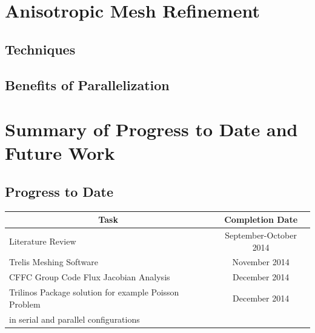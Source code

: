 \documentclass[titlepage,11pt,letterpaper]{article}
\begin{document}
\newpage
\section{Anisotropic Mesh Refinement}
\subsection{Techniques}
\subsection{Benefits of Parallelization}



\newpage
\section{Summary of Progress to Date and Future Work}

\subsection{Progress to Date}

\begin{tabular}{|l|c|} \hline
\multicolumn{1}{|c|}{\bf{Task}} & \multicolumn{1}{|c|}{\bf{Completion Date}} \\

\hline Literature Review & September-October 2014 \\

\hline Trelis Meshing Software & November 2014 \\

\hline CFFC Group Code Flux Jacobian Analysis & December 2014 \\

\hline Trilinos Package solution for example Poisson Problem & December 2014 \\in serial and parallel configurations & \\

\hline
\end{tabular}
\end{document}
